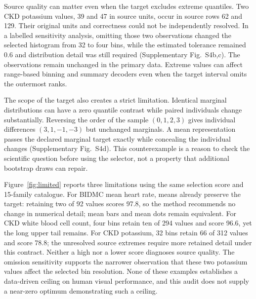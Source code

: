 \documentclass[11pt]{article}
\begin{document}
Source quality can matter even when the target excludes extreme quantiles. Two CKD potassium values, 39 and 47 in source units, occur in source rows 62 and 129. Their original units and correctness could not be independently resolved. In a labelled sensitivity analysis, omitting those two observations changed the selected histogram from 32 to four bins, while the estimated tolerance remained 0.6 and distribution detail was still required (Supplementary Fig.~S4b,c). The observations remain unchanged in the primary data. Extreme values can affect range-based binning and summary decoders even when the target interval omits the outermost ranks.

The scope of the target also creates a strict limitation. Identical marginal distributions can have a zero quantile contrast while paired individuals change substantially. Reversing the order of the sample $(0,1,2,3)$ gives individual differences $(3,1,-1,-3)$ but unchanged marginals. A mean representation passes the declared marginal target exactly while concealing the individual changes (Supplementary Fig.~S4d). This counterexample is a reason to check the scientific question before using the selector, not a property that additional bootstrap draws can repair.




Figure~\ref{fig:limited} reports three limitations using the same selection score and 15-family catalogue. For BIDMC mean heart rate, means already preserve the target: retaining two of 92 values scores 97.8, so the method recommends no change in numerical detail; mean bars and mean dots remain equivalent. For CKD white blood cell count, four bins retain ten of 294 values and score 96.6, yet the long upper tail remains. For CKD potassium, 32 bins retain 66 of 312 values and score 78.8; the unresolved source extremes require more retained detail under this contract.\cite{bidmc,kidney} Neither a high nor a lower score diagnoses source quality. The omission sensitivity supports the narrower observation that these two potassium values affect the selected bin resolution. None of these examples establishes a data-driven ceiling on human visual performance, and this audit does not supply a near-zero optimum demonstrating such a ceiling.
\end{document}
